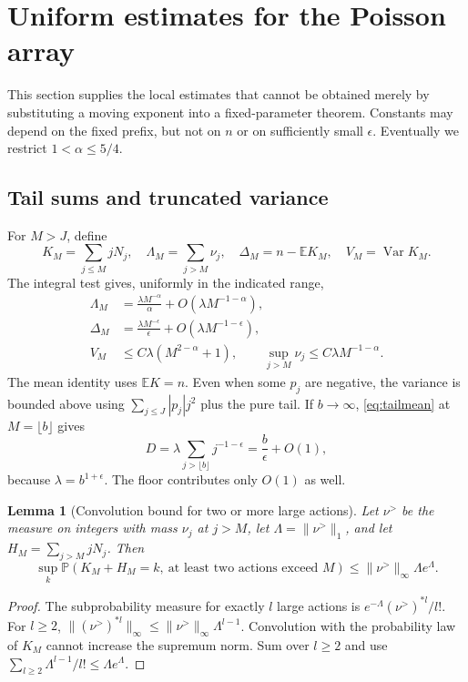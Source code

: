 \documentclass[11pt,a4paper]{article}
\numberwithin{equation}{section}
\newtheorem{lemma}[theorem]{Lemma}
\theoremstyle{definition}
\theoremstyle{remark}
\newcommand{\E}{\mathbb E}
\newcommand{\Prob}{\mathbb P}
\newcommand{\ee}{\epsilon}
\DeclareMathOperator{\Var}{Var}
\begin{document}
\section{Uniform estimates for the Poisson array}
\label{sec:estimates}
This section supplies the local estimates that cannot be obtained merely
by substituting a moving exponent into a fixed-parameter theorem. Constants
may depend on the fixed prefix, but not on $n$ or on sufficiently small
$\ee$. Eventually we restrict $1<\alpha\le5/4$.

\subsection{Tail sums and truncated variance}
For $M>J$, define
\begin{equation}\label{eq:truncated}
 K_M=\sum_{j\le M}jN_j,\quad
 \Lambda_M=\sum_{j>M}\nu_j,\quad
 \Delta_M=n-\E K_M,\quad V_M=\Var K_M.
\end{equation}
The integral test gives, uniformly in the indicated range,
\begin{align}
 \Lambda_M&=\frac{\lambda M^{-\alpha}}{\alpha}
             +O(\lambda M^{-1-\alpha}),\label{eq:tailnumber}\\
 \Delta_M&=\frac{\lambda M^{-\ee}}{\ee}
             +O(\lambda M^{-1-\ee}),\label{eq:tailmean}\\
 V_M&\le C\lambda(M^{2-\alpha}+1),\qquad
 \sup_{j>M}\nu_j\le C\lambda M^{-1-\alpha}.\label{eq:variance}
\end{align}
The mean identity uses $\E K=n$. Even when some $p_j$ are negative, the
variance is bounded above using $\sum_{j\le J}|p_j|j^2$ plus the pure tail.
If $b\to\infty$, \eqref{eq:tailmean} at $M=\lfloor b\rfloor$ gives
\begin{equation}\label{eq:Dproof}
 D=\lambda\sum_{j>\lfloor b\rfloor}j^{-1-\ee}
   =\frac{b}{\ee}+O(1),
\end{equation}
because $\lambda=b^{1+\ee}$. The floor contributes only $O(1)$ as well.

\begin{lemma}[Convolution bound for two or more large actions]
\label{lem:twobig}
Let $\nu^>$ be the measure on integers with mass $\nu_j$ at $j>M$,
let $\Lambda=\|\nu^>\|_1$, and let $H_M=\sum_{j>M}jN_j$. Then
\begin{equation}\label{eq:twobig}
 \sup_k\Prob(K_M+H_M=k,\ \text{at least two actions exceed }M)
 \le \|\nu^>\|_\infty\Lambda e^\Lambda.
\end{equation}
\end{lemma}
\begin{proof}
The subprobability measure for exactly $l$ large actions is
$e^{-\Lambda}(\nu^>)^{*l}/l!$. For $l\ge2$,
$\|(\nu^>)^{*l}\|_\infty\le\|\nu^>\|_\infty\Lambda^{l-1}$.
Convolution with the probability law of $K_M$ cannot increase the supremum
norm. Sum over $l\ge2$ and use
$\sum_{l\ge2}\Lambda^{l-1}/l!\le\Lambda e^\Lambda$.
\end{proof}
\end{document}
